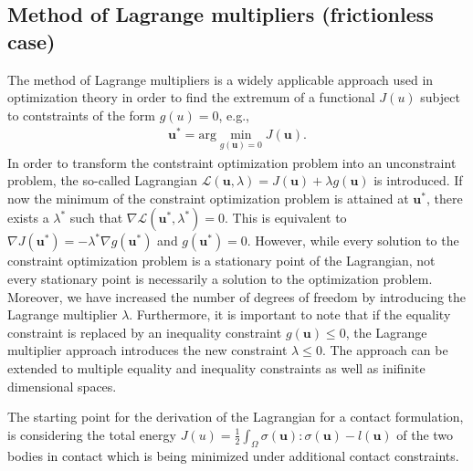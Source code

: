 \documentclass[12pt]{article}
\newcommand{\mbf}[1]{\mathbf{#1}}
\newcommand{\mrm}[1]{\mathrm{#1}}
\newcommand{\mcl}[1]{\mathcal{#1}}
\newcommand{\mbu}{\mbf{u}}
\begin{document}
\subsection{Method of Lagrange multipliers (frictionless case)}
The method of Lagrange multipliers is a widely applicable approach used in optimization theory in order to find the extremum of  a functional $J(u)$ subject to contstraints of the form $g(u) = 0$, e.g.,
\begin{align*}
  \bm u^{\ast} = \mrm{arg}\min_{g(\bm u) = 0}J(\bm u).
\end{align*}
In order to transform the contstraint optimization problem into an unconstraint  problem, the so-called Lagrangian $\mcl{L}(\bm u, \lambda) = J(\bm u)+\lambda g(\bm u)$ is introduced. If now the minimum of the constraint optimization problem is attained at $\bm u^{\ast}$, there exists a $\lambda^{\ast}$ such that $\nabla \mcl{L}(\bm u^{\ast}, \lambda^{\ast}) = 0$. This is equivalent to
$\nabla J(\bm{u}^{\ast}) = -\lambda^{\ast} \nabla g(\bm u^{\ast})$ and $g(\bm{u}^{\ast}) = 0$. However, while every solution to the constraint optimization problem is a stationary point of the Lagrangian, not every stationary point is necessarily a solution to the optimization problem. Moreover, we have increased the number of degrees of freedom by introducing the Lagrange multiplier $\lambda$. Furthermore, it is important to note that if the equality constraint is replaced by an inequality constraint $g(\bm u) \leq 0$, the Lagrange multiplier approach introduces the new constraint $\lambda \leq 0$. The approach can  be extended to multiple equality and inequality constraints as well as inifinite dimensional spaces.

The starting point for the derivation of the Lagrangian for a contact formulation, is
considering the total energy $J(u) =\frac{1}{2} \int_{\Omega}\sigma(\mbu):\sigma(\mbu)-l(\mbu)$ of the two bodies in contact which is being minimized under
additional contact constraints.
\end{document}
